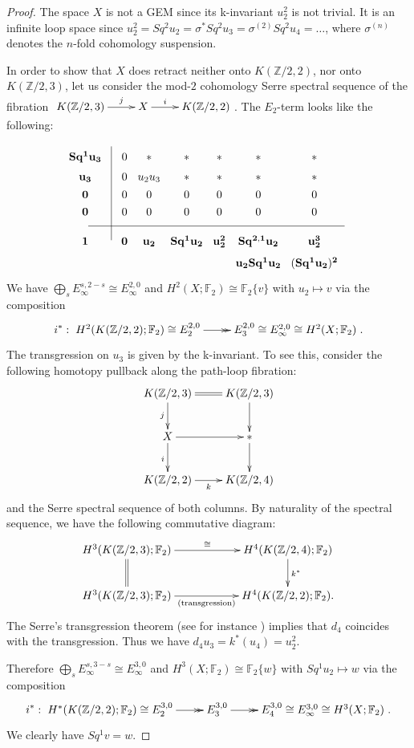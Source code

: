 \documentclass{amsart}
\theoremstyle{definition}
\theoremstyle{remark}
\newcommand{\Z}{\mathbb{Z}}
\newcommand{\F}{\mathbb{F}}
\begin{document}
\begin{proof}
The space $X$ is not a GEM since its k-invariant $u_2^2$ is not trivial. It is an infinite loop space since $u_2^2=Sq^2u_2=\sigma^*Sq^2u_3=\sigma^{(2)}Sq^2u_4=\dots$, where $\sigma^{(n)}$ denotes the $n$-fold cohomology suspension. 

\newpage
In order to show that $X$ does retract neither onto $K(\Z/2,2)$, nor onto $K(\Z/2,3)$, let us consider the mod-$2$ cohomology Serre spectral sequence of the fibration $\xymatrix{K(\Z/2,3)\ar[r]^-j &X\ar[r]^-i &K(\Z/2,2)}$. 
The $E_2$-term looks like the following:
$$\xymatrix@R=0.1cm@C=0.1cm{
&&\\
{\bf Sq^1u_3}  &&0 &{*} &{*} &{*} &{*} &{*}\\
{\bf u_3}  &&0 &u_2u_3&{*} &{*} &{*} &{*}\\
{\bf 0} &&0 &0 &0 &0 &0 &0\\
{\bf 0} &&0 &0 &0 &0 &0 &0\\ \ar@{-}[rrrrrrrr] &&&&&&&&\\
{\bf 1} &\ar@{-}[uuuuuu] &{\bf 0} &{\bf u_2} &{\bf Sq^1u_2} &{\bf u_2^2} &{\bf Sq^{2,1}u_2} &{\bf u_2^3}\\
&&&&&&{\bf u_2Sq^1u_2} &{\bf (Sq^1 u_2)^2}
}$$
We have $\bigoplus_{s}E_\infty^{s,2-s}\cong E_\infty^{2,0}$ and $H^2(X;\F_2)\cong\F_2\{v\}$ with $u_2\mapsto v$ via the composition
$$
i^*:\xymatrix{H^2(K(\Z/2,2);\F_2)\cong E^{2,0}_2\ar@{->>}[r] &E^{2,0}_3\cong E^{2,0}_\infty\cong H^2(X;\F_2)}.
$$ 
The transgression on $u_3$ is given by the k-invariant. To see this, consider the following homotopy pullback along the path-loop fibration:
$$\xymatrix{
K(\Z/2,3)\ar[d]_j\ar@{=}[r] &K(\Z/2,3)\ar[d]\\
X\ar[d]_i\ar[r] &{*}\ar[d]\\
K(\Z/2,2)\ar[r]_-k &K(\Z/2,4)
}$$ and the Serre spectral sequence of both columns. By naturality of the spectral sequence, we have the following commutative diagram:
$$\xymatrix@C=2truecm{
H^3(K(\Z/2,3);\F_2)\ar@{=}[d]\ar[r]^-\cong &H^4(K(\Z/2,4);\F_2)\ar[d]^{k^*}\\
H^3(K(\Z/2,3);\F_2)\ar[r]_-{\text{(transgression)}} &H^4(K(\Z/2,2);\F_2).
}$$ The Serre's transgression theorem (see for instance \cite[Theorem 6.8, p. 189]{Mc00}) implies that $d_4$ coincides with the transgression. Thus we have $d_4u_3=k^*(u_4)=u_2^2$. 

Therefore $\bigoplus_{s}E_\infty^{s,3-s}\cong E_\infty^{3,0}$ and $H^3(X;\F_2)\cong\F_2\{w\}$ with $Sq^1u_2\mapsto w$ via the composition
$$
i^*:\xymatrix{H^*(K(\Z/2,2);\F_2)\cong E_2^{3,0}\ar@{->>}[r] &E_3^{3,0}\ar@{->>}[r] &E_4^{3,0}\cong E_\infty^{3,0}\cong H^3(X;\F_2)}.
$$ 
We clearly have $Sq^1v=w$.


\end{proof}
\end{document}
